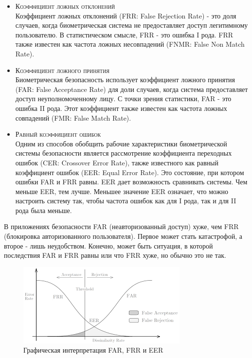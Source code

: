 \documentclass[12pt]{article}
\begin{document}
    \begin{itemize}
        \item \textsc{Коэффициент ложных отклонений} \\
        Коэффициент ложных отклонений (FRR: False Rejection Rate) - это доля случаев, когда биометрическая система не предоставляет доступ легитимному пользователю. В статистическом смысле, FRR - это ошибка I рода. FRR также известен как частота ложных несовпадений (FNMR: False Non Match Rate).

        \item \textsc{Коэффициент ложного принятия} \\
        Биометрическая безопасность использует коэффициент ложного принятия (FAR: False Acceptance Rate) для доли случаев, когда система предоставляет доступ неуполномоченному лицу. С точки зрения статистики, FAR - это ошибка II рода. Этот коэффициент также известен как частота ложных совпадений (FMR: False Match Rate).

        \item \textsc{Равный коэффициент ошибок} \\
        Одним из способов обобщить рабочие характеристики биометрической системы безопасности является рассмотрение коэффициента переходных ошибок (CER: Crossover Error Rate), также известного как равный коэффициент ошибок (EER: Equal Error Rate). Это состояние, при котором ошибки FAR и FRR равны. EER дает возможность сравнивать системы. Чем меньше EER, тем лучше. Меньшее значение EER означает, что можно настроить систему так, чтобы частота ошибок как для I рода, так и для II рода была меньше.
    \end{itemize}

    \par В приложениях безопасности FAR (неавторизованный доступ) хуже, чем FRR (блокировка авторизованного пользователя). Первое может стать катастрофой, а второе - лишь неудобством. Конечно, может быть ситуация, в которой последствия FAR и FRR равны или что FRR хуже, но обычно это не так.

    \begin{figure}[h!]
        \centering
        \includegraphics[width=0.55\linewidth]{EER.png}
        \caption{Графическая интерпретация FAR, FRR и EER}
        \label{sec:Overview:Metrics:fig:FAR_FRR_EER}
    \end{figure}
\end{document}

